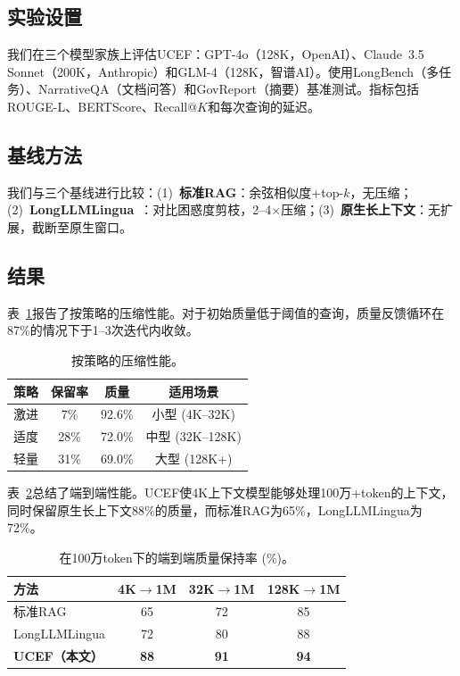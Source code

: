 \documentclass[journal]{IEEEtran}
\newcommand{\ucef}{\textsf{UCEF}}
\begin{document}
\subsection{实验设置}

我们在三个模型家族上评估\ucef{}：GPT-4o（128K，OpenAI）、Claude~3.5 Sonnet（200K，Anthropic）和GLM-4（128K，智谱AI）。使用LongBench（多任务）、NarrativeQA（文档问答）和GovReport（摘要）基准测试。指标包括ROUGE-L、BERTScore、Recall@$K$和每次查询的延迟。

\subsection{基线方法}

我们与三个基线进行比较：(1)~\textbf{标准RAG}：余弦相似度+top-$k$，无压缩；(2)~\textbf{LongLLMLingua}~\cite{jiang2024longllmlingua}：对比困惑度剪枝，2--4$\times$压缩；(3)~\textbf{原生长上下文}：无扩展，截断至原生窗口。

\subsection{结果}

表~\ref{tab:compression}报告了按策略的压缩性能。对于初始质量低于阈值的查询，质量反馈循环在87\%的情况下于1--3次迭代内收敛。

\begin{table}[t]
\caption{按策略的压缩性能。}
\label{tab:compression}
\centering
\small
\begin{tabular}{@{}lccc@{}}
\toprule
策略   & 保留率 & 质量 & 适用场景 \\
\midrule
激进 &  7\% & 92.6\% & 小型 (4K--32K) \\
适度   & 28\% & 72.0\% & 中型 (32K--128K) \\
轻量      & 31\% & 69.0\% & 大型 (128K+) \\
\bottomrule
\end{tabular}
\end{table}

表~\ref{tab:e2e}总结了端到端性能。\ucef{}使4K上下文模型能够处理100万+token的上下文，同时保留原生长上下文88\%的质量，而标准RAG为65\%，LongLLMLingua为72\%。

\begin{table}[t]
\caption{在100万token下的端到端质量保持率 (\%)。}
\label{tab:e2e}
\centering
\small
\begin{tabular}{@{}lccc@{}}
\toprule
方法 & 4K$\to$1M & 32K$\to$1M & 128K$\to$1M \\
\midrule
标准RAG   & 65 & 72 & 85 \\
LongLLMLingua  & 72 & 80 & 88 \\
\textbf{\ucef{}（本文）} & \textbf{88} & \textbf{91} & \textbf{94} \\
\bottomrule
\end{tabular}
\end{table}
\end{document}
